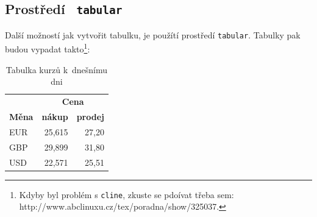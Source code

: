 \documentclass[a4paper, 11pt]{article}
\begin{document}
    \subsection{Prostředí \texttt{ tabular}}
    Další možností jak vytvořit tabulku, je použítí prostředí \verb|tabular|. Tabulky pak budou vypadat takto\footnote{Kdyby byl problém s \texttt{cline}, zkuste se pdoívat třeba sem:  http://www.abclinuxu.cz/tex/poradna/show/325037.}:
    \bigskip
     \begin{table}[h]
    		\centering
    		\begin{tabular}{|l|r|r|}
    			\hline
    							& \multicolumn{2}{c|}{\textbf{Cena}}	\\ \cline{2-3}
    			\textbf{Měna}	& \textbf{nákup}	& \textbf{prodej}	\\ \hline
    			EUR				& 25,615		    & 27,20				\\
    			GBP				& 29,899			& 31,80				\\
    			USD				& 22,571			& 25,51				\\ \hline
    		\end{tabular}
    		\caption{Tabulka kurzů k~dnešnímu dni}
    		\label{table:kurzy}
    \end{table}
    \bigskip
\end{document}
